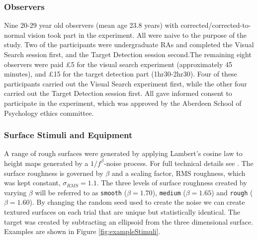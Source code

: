 \documentclass[preprint, authoryear]{elsarticle} %
\begin{document}
\subsubsection{Observers}
Nine 20-29 year old observers (mean age 23.8 years) with corrected/corrected-to-normal vision took part in the experiment. All were naive to the purpose of the study. Two of the participants were undergraduate RAs and completed the Visual Search session first, and the Target Detection session second.The remaining eight observers were paid \pounds 5 for the visual search experiment (approximately 45 minutes), and \pounds 15 for the target detection part (1hr30-2hr30). Four of these participants carried out the Visual Search experiment first, while the other four carried out the Target Detection session first. All gave informed consent to participate in the experiment, which was approved by the Aberdeen School of Psychology ethics committee.

\subsubsection{Surface Stimuli and Equipment}
\label{sec:stimuli}
A range of rough surfaces were generated by applying Lambert's cosine law to height maps generated by a $1/f^{\beta}$-noise process. For full technical details see \citet{clarke2008}. The surface roughness is governed by $\beta$ and a scaling factor, RMS roughness, which was kept constant, $\sigma_{RMS}=1.1$. The three levels of surface roughness created by varying $\beta$ will be referred to as \texttt{smooth} ($\beta=1.70$), \texttt{medium} ($\beta=1.65$) and \texttt{rough} ($\beta=1.60$).  By changing the random seed used to create the noise we can create textured surfaces on each trial that are unique but statistically identical. The target was created by subtracting an ellipsoid from the three dimensional surface. Examples are shown in Figure \ref{fig:exampleStimuli}. 
\end{document}
